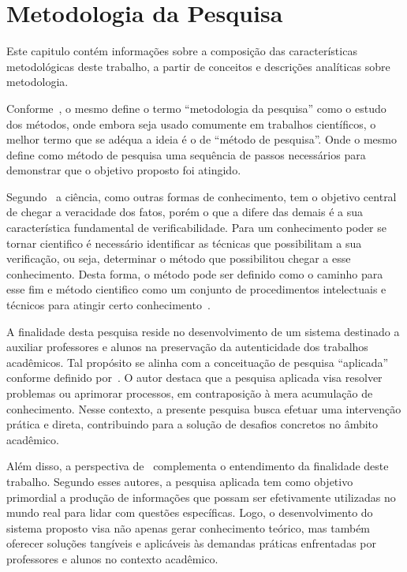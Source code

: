 \chapter{Metodologia da Pesquisa}\label{ch:metodologia-da-pesquisa}

Este capitulo contém informações sobre a composição das
características metodológicas deste trabalho, a partir de conceitos e
descrições analíticas sobre metodologia.

Conforme~\textcite{wazlawick2009}, o mesmo define o termo
“metodologia da pesquisa” como o estudo dos métodos, onde embora
seja usado comumente em trabalhos científicos, o melhor termo que
se adéqua a ideia é o de “método de pesquisa”.
Onde o mesmo define como método de pesquisa uma sequência de passos
necessários para demonstrar que o objetivo proposto foi atingido.

Segundo~\textcite{gil2017} a ciência, como outras formas de
conhecimento, tem o objetivo central de chegar a veracidade dos
fatos, porém o que a difere das demais é a sua característica
fundamental de verificabilidade.
Para um conhecimento poder se tornar cientifico é necessário
identificar as técnicas que possibilitam a sua verificação, ou seja,
determinar o método que possibilitou chegar a esse conhecimento.
Desta forma, o método pode ser definido como o caminho para esse fim
e método cientifico como um conjunto de procedimentos intelectuais
e técnicos para atingir certo conhecimento~\cite{gil2017}.

A finalidade desta pesquisa reside no desenvolvimento de um sistema destinado a
auxiliar professores e alunos na preservação da autenticidade dos trabalhos
acadêmicos.
Tal propósito se alinha com a conceituação de pesquisa “aplicada” conforme
definido por~\textcite{gil2017}.
O autor destaca que a pesquisa aplicada visa resolver problemas ou aprimorar
processos, em contraposição à mera acumulação de conhecimento.
Nesse contexto, a presente pesquisa busca efetuar uma intervenção prática e
direta, contribuindo para a solução de desafios concretos no âmbito acadêmico.

Além disso, a perspectiva de~\textcite{prodanov2013} complementa o entendimento
da finalidade deste trabalho.
Segundo esses autores, a pesquisa aplicada tem como objetivo primordial a
produção de informações que possam ser efetivamente utilizadas no mundo real
para lidar com questões específicas.
Logo, o desenvolvimento do sistema proposto visa não apenas gerar conhecimento
teórico, mas também oferecer soluções tangíveis e aplicáveis às demandas
práticas enfrentadas por professores e alunos no contexto acadêmico.

